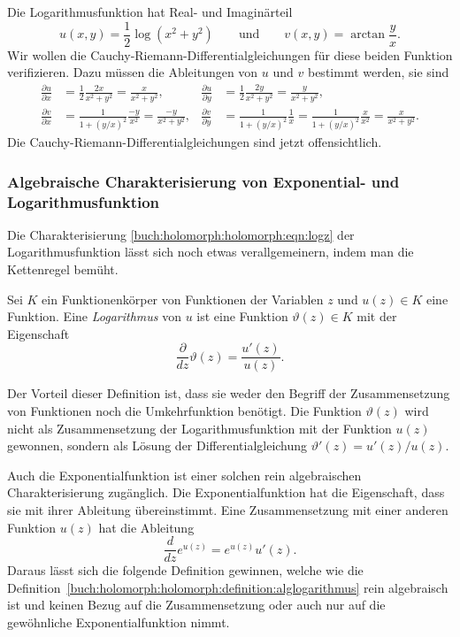 \begin{beispiel}
Die Logarithmusfunktion hat Real- und Imaginärteil
\[
u(x,y)
=
\frac12
\log(x^2+y^2)
\qquad\text{und}\qquad
v(x,y)
=
\arctan\frac{y}{x}.
\]
Wir wollen die Cauchy-Riemann-Differentialgleichungen für diese beiden
Funktion verifizieren.
Dazu müssen die Ableitungen von $u$ und $v$ bestimmt werden, sie sind
\begin{align*}
\frac{\partial u}{\partial x}
&=
\frac12
\frac{2x}{x^2+y^2}
=
\frac{x}{x^2+y^2},
&
\frac{\partial u}{\partial y}
&=
\frac12
\frac{2y}{x^2+y^2}
=
\frac{y}{x^2+y^2},
\\
\frac{\partial v}{\partial x}
&=
\frac{1}{1+(y/x)^2}
\frac{-y}{x^2}
=
\frac{-y}{x^2+y^2},
&
\frac{\partial v}{\partial y}
&=
\frac{1}{1+(y/x)^2}\frac{1}{x}
=
\frac{1}{1+(y/x)^2}\frac{x}{x^2}
=
\frac{x}{x^2+y^2}.
\end{align*}
Die Cauchy-Riemann-Differentialgleichungen sind jetzt offensichtlich.
\end{beispiel}

%
%
\subsubsection{Algebraische Charakterisierung von Exponential- und Logarithmusfunktion}
Die Charakterisierung \eqref{buch:holomorph:holomorph:eqn:logz}
der Logarithmusfunktion lässt sich noch etwas verallgemeinern, indem
man die Kettenregel bemüht.

\begin{definition}
\label{buch:holomorph:holomorph:definition:alglogarithmus}
Sei $K$ ein Funktionenkörper von Funktionen der Variablen $z$ und
$u(z)\in K$ eine Funktion.
Eine \emph{Logarithmus} von $u$ ist eine Funktion $\vartheta(z)\in K$
%
mit der Eigenschaft
\[
\frac{\partial}{dz}\vartheta(z)
=
\frac{u'(z)}{u(z)}.
\]
\end{definition}

Der Vorteil dieser Definition ist, dass sie weder den Begriff der
Zusammensetzung von Funktionen noch die Umkehrfunktion benötigt.
Die Funktion $\vartheta(z)$ wird nicht als Zusammensetzung der
Logarithmusfunktion mit der Funktion $u(z)$ gewonnen, sondern als
Lösung der Differentialgleichung $\vartheta'(z) = u'(z)/u(z)$.

Auch die Exponentialfunktion ist einer solchen rein algebraischen
Charakterisierung zugänglich.
Die Exponentialfunktion hat die Eigenschaft, dass sie mit ihrer
Ableitung übereinstimmt.
Eine Zusammensetzung mit einer anderen Funktion $u(z)$ hat die
Ableitung
\[
\frac{d}{dz} e^{u(z)}
=
e^{u(z)} u'(z).
\]
Daraus lässt sich die folgende Definition gewinnen, welche wie die
Definition~\ref{buch:holomorph:holomorph:definition:alglogarithmus}
rein algebraisch ist und keinen Bezug auf die Zusammensetzung oder
auch nur auf die gewöhnliche Exponentialfunktion nimmt.

